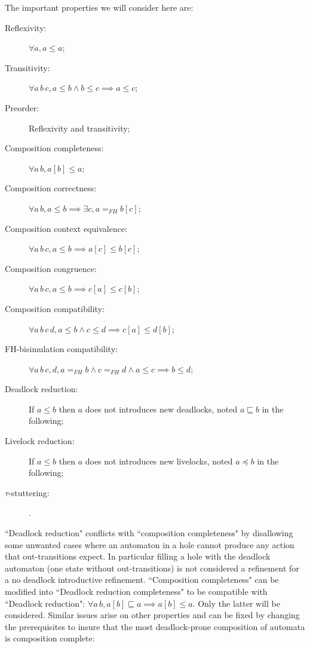 \documentclass{article}
\theoremstyle{plain}
\theoremstyle{definition}
\newcommand\mbrk[1]{{\left[#1\right]}}
\begin{document}
The important properties we will consider here are:
\begin{description}
\item[Reflexivity:] \(\forall a, a \leq a\);
\item[Transitivity:] \(\forall a\, b\, c, a \leq b \wedge b \leq c \implies a \leq c\);
\item[Preorder:] Reflexivity and transitivity;
\item[Composition completeness:] \(\forall a\, b, a\mbrk{b} \leq a\);
\item[Composition correctness:] \(\forall a\, b, a \leq b \implies \exists c, a =_{FH} b\mbrk{c}\);
\item[Composition context equivalence:] \(\forall a\, b\, c, a \leq b \implies a\mbrk{c} \leq b\mbrk{c}\);
\item[Composition congruence:] \(\forall a\, b\, c, a \leq b \implies c\mbrk{a} \leq c\mbrk{b}\);
\item[Composition compatibility:] \(\forall a\, b\, c\, d, a \leq b \wedge c \leq d \implies c\mbrk{a} \leq d\mbrk{b}\);
\item[FH-bisimulation compatibility:] \(\forall a\, b\, c, d, a =_{FH} b \wedge c =_{FH} d \wedge a \leq c \implies b \leq d\);
\item[Deadlock reduction:] If \(a \leq b\) then \(a\) does not introduces new deadlocks, noted \(a \sqsubseteq b\) in the following; %
\item[Livelock reduction:] If \(a \leq b\) then \(a\) does not introduces new livelocks, noted \(a \preceq b\) in the following; %
\item[\(\tau\)-stuttering:] .%
\end{description}
``Deadlock reduction" conflicts with ``composition completeness" by disallowing some unwanted cases where an automaton in a hole cannot produce any action that out-transitions expect. %
In particular filling a hole with the deadlock automaton (one state without out-transitions) is not considered a refinement for a no deadlock introductive refinement.
``Composition completeness" can be modified into ``Deadlock reduction completeness" to be compatible with ``Deadlock reduction": \(\forall a\, b, a\mbrk{b} \sqsubseteq a \implies a\mbrk{b} \leq a\).
Only the latter will be considered.
Similar issues arise on other properties and can be fixed by changing the prerequisites to insure that the most deadlock-prone composition of automata is composition complete:
\end{document}
